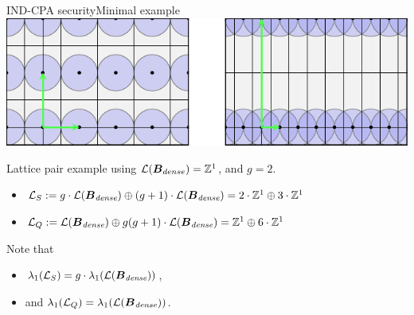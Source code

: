 \documentclass[10pt]{beamer}
\begin{document}
\begin{frame}{IND-CPA security}{Minimal example}
				\includegraphics{figures/ind-cpa-challenge-2.pdf}
				\begin{example}
								Lattice pair example using $\mathcal{L}(\boldsymbol{B}_{dense}) = \mathbb{Z}^{1}$, and $g = 2$.
								\begin{itemize}
												\item $\mathcal{L}_{S} := g \cdot \mathcal{L}(\boldsymbol{B}_{\textit{dense}}) \oplus (g+1) \cdot \mathcal{L}(\boldsymbol{B}_{\textit{dense}}) = 2 \cdot \mathbb{Z}^{1} \oplus 3 \cdot \mathbb{Z}^{1}$
												\item $\mathcal{L}_{Q} := \mathcal{L}(\boldsymbol{B}_{\textit{dense}}) \oplus g (g + 1) \cdot \mathcal{L}(\boldsymbol{B}_{\textit{dense}}) =  \mathbb{Z}^{1} \oplus 6 \cdot \mathbb{Z}^{1}$
								\end{itemize}
								Note that 
								\begin{itemize}
												\item $\lambda_{1}(\mathcal{L}_{S}) = g \cdot \lambda_{1}(\mathcal{L}(\boldsymbol{B}_{\textit{dense}}))$,
												\item and $\lambda_{1}(\mathcal{L}_{Q}) = \lambda_{1}(\mathcal{L}(\boldsymbol{B}_{\textit{dense}}))$.
								\end{itemize}
				\end{example}
\end{frame}
\end{document}
